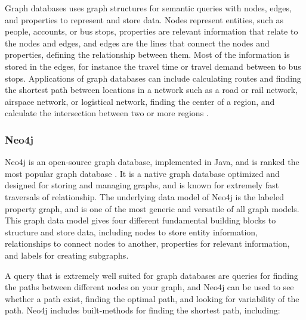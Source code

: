 Graph databases uses graph structures for semantic queries with nodes, edges, and properties to represent and store data.
Nodes represent entities, such as people, accounts, or bus stops, properties are relevant information that relate to the nodes and edges, and edges are the lines that connect the nodes and properties, defining the relationship between them. Most of the information is stored in the edges, for instance the travel time or travel demand between to bus stops. 
Applications of graph databases can include calculating routes and finding the shortest path between locations in a network such as a road or rail network, airspace network, or logistical network, finding the center of a region, and calculate the intersection between two or more regions \citep[p.102]{robinson13}. 

\subsubsection{Neo4j}
\label{subsubsec:neo4j}
Neo4j\citep{website:neo4j} is an open-source graph database, implemented in Java, and is ranked the most popular graph database \citep{website:graphdbranking}. It is a native graph database optimized and designed for storing and managing graphs, and is known for extremely fast traversals of relationship. The underlying data model of Neo4j is the labeled property graph, and is one of the most generic and versatile of all graph models\citep[p.73]{robinson13}. This graph data model gives four different fundamental building blocks to structure and store data, including nodes to store entity information, relationships to connect nodes to another, properties for relevant information, and labels for creating subgraphs. 

A query that is extremely well suited for graph databases are queries for finding the paths between different nodes on your graph, and Neo4j can be used to see whether a path exist, finding the optimal path, and looking for variability of the path\citep[p. 51]{bruggen14}. Neo4j includes built-methods for finding the shortest path, including:


